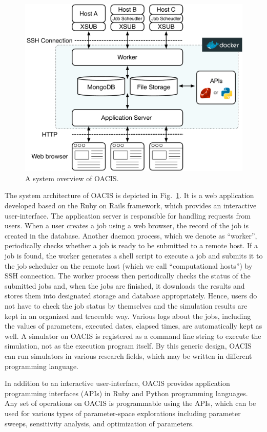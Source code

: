 \begin{figure}
  \centering
  \includegraphics[width=.8\linewidth]{Figs.murase/oacis_overview.pdf}
  \caption{A system overview of OACIS.}
  \label{fig:oacis_overview}
\end{figure}

The system architecture of OACIS is depicted in Fig.~\ref{fig:oacis_overview}.
It is a web application developed based on the Ruby on Rails framework, which provides an interactive user-interface.
The application server is responsible for handling requests from users. When a user creates a job using a web browser, the record of the job is created in the database.
Another daemon process, which we denote as ``worker'', periodically checks whether a job is ready to be submitted to a remote host.
If a job is found, the worker generates a shell script to execute a job and submits it to the job scheduler on the remote host (which we call ``computational hosts'') by SSH connection.
The worker process then periodically checks the status of the submitted jobs and, when the jobs are finished, it downloads the results and stores them into designated storage and database appropriately.
Hence, users do not have to check the job status by themselves and the simulation results are kept in an organized and traceable way.
Various logs about the jobs, including the values of parameters, executed dates, elapsed times, are automatically kept as well.
A simulator on OACIS is registered as a command line string to execute the simulation, not as the execution program itself.
By this generic design, OACIS can run simulators in various research fields, which may be written in different programming language.

In addition to an interactive user-interface, OACIS provides application programming interfaces (APIs) in Ruby and Python programming languages.
Any set of operations on OACIS is programmable using the APIs, which can be used for various types of parameter-space explorations including parameter sweeps, sensitivity analysis, and optimization of parameters.

